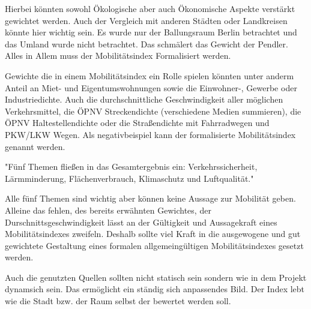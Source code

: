 Hierbei könnten sowohl Ökologische aber auch Ökonomische Aspekte verstärkt gewichtet werden. %
Auch der Vergleich mit anderen Städten oder Landkreisen könnte hier wichtig sein. Es wurde nur der Ballungsraum Berlin betrachtet und das Umland wurde nicht betrachtet. Das schmälert das Gewicht der Pendler. Alles in Allem muss der Mobilitätsindex Formalisiert werden. 

Gewichte die in einem Mobilitätsindex ein Rolle spielen könnten unter anderm Anteil an Miet- und Eigentumswohnungen sowie die Einwohner-, 
Gewerbe oder Industriedichte. Auch die durchschnittliche Geschwindigkeit aller möglichen Verkehrsmittel, 
die ÖPNV Streckendichte (verschiedene Medien summieren), die ÖPNV Haltestellendichte oder die Straßendichte mit Fahrradwegen und PKW/LKW Wegen.
Als negativbeispiel kann der formalisierte Mobilitätsindex genannt werden.







"Fünf Themen fließen in das Gesamtergebnis ein: Verkehrssicherheit, Lärmminderung, Flächenverbrauch, Klimaschutz und Luftqualität."


Alle fünf Themen sind wichtig aber können keine Aussage zur Mobilität geben. Alleine das fehlen, des bereits erwähnten Gewichtes, der Durschnittsgeschwindigkeit lässt an der Gültigkeit und Aussagekraft eines Mobilitätsindexes zweifeln.
Deshalb sollte viel Kraft in die ausgewogene und gut gewichtete Gestaltung eines formalen allgemeingültigen Mobilitätsindexes gesetzt werden.

Auch die genutzten Quellen sollten nicht statisch sein sondern wie in dem Projekt dynamsich sein. Das ermöglicht ein ständig sich anpassendes Bild. Der Index lebt wie die Stadt bzw. der Raum selbst der bewertet werden soll.
